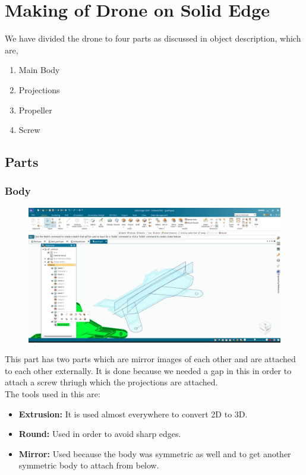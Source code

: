 \documentclass{article}
\begin{document}
\section{Making of Drone on Solid Edge}
We have divided the drone to four parts as discussed in object description, which are, 
\begin{enumerate}
\item Main Body 
\item Projections
\item Propeller
\item Screw
\end{enumerate}
\subsection{Parts}
\subsubsection{Body}
\begin{figure}[H]
\centering
\includegraphics[scale = 0.3 ]{./figs/body1.jpeg}
\end{figure}
This part has two parts which are mirror images of each other and are attached to each other externally. It is done because we needed a gap in this in order to attach a screw thriugh which the projections are attached. \\
The tools used in this are:
\begin{itemize}
\item \textbf{Extrusion: }It is used almost everywhere to convert 2D to 3D.
\item \textbf{Round: } Used in order to avoid sharp edges.
\item \textbf{Mirror: } Used because the body was symmetric as well and to get another symmetric body to attach from below.
\end{itemize}
\end{document}
